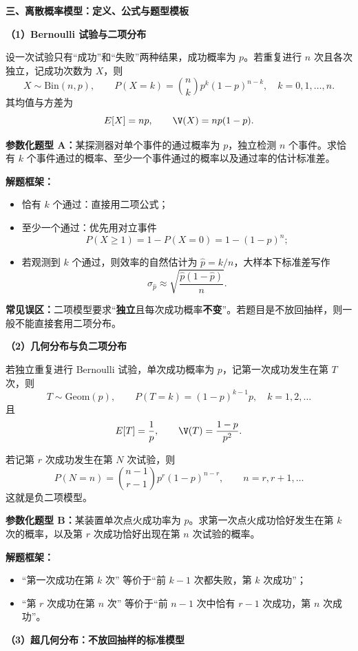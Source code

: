 \textbf{三、离散概率模型：定义、公式与题型模板}

\textbf{（1）Bernoulli 试验与二项分布}

设一次试验只有“成功”和“失败”两种结果，成功概率为 $p$。若重复进行 $n$ 次且各次独立，记成功次数为 $X$，则
\[
X\sim \mathrm{Bin}(n,p),\qquad P(X=k)=\binom{n}{k}p^k(1-p)^{n-k},\quad k=0,1,\dots,n.
\]
其均值与方差为
\[
E[X]=np,\qquad \V(X)=np(1-p).
\]

\textbf{参数化题型 A：}某探测器对单个事件的通过概率为 $p$，独立检测 $n$ 个事件。求恰有 $k$ 个事件通过的概率、至少一个事件通过的概率以及通过率的估计标准差。

\textbf{解题框架：}
\begin{itemize}[leftmargin=2em,itemsep=0.12em,topsep=0.12em]
  \item 恰有 $k$ 个通过：直接用二项公式；
  \item 至少一个通过：优先用对立事件
  \[
  P(X\ge 1)=1-P(X=0)=1-(1-p)^n;
  \]
  \item 若观测到 $k$ 个通过，则效率的自然估计为 $\hat p=k/n$，大样本下标准差写作
  \[
  \sigma_{\hat p}\approx \sqrt{\frac{\hat p(1-\hat p)}{n}}.
  \]
\end{itemize}

\textbf{常见误区：}二项模型要求“\textbf{独立}且每次成功概率\textbf{不变}”。若题目是不放回抽样，则一般不能直接套用二项分布。

\textbf{（2）几何分布与负二项分布}

若独立重复进行 Bernoulli 试验，单次成功概率为 $p$，记第一次成功发生在第 $T$ 次，则
\[
T\sim \mathrm{Geom}(p),\qquad P(T=k)=(1-p)^{k-1}p,\quad k=1,2,\dots
\]
且
\[
E[T]=\frac{1}{p},\qquad \V(T)=\frac{1-p}{p^2}.
\]

若记第 $r$ 次成功发生在第 $N$ 次试验，则
\[
P(N=n)=\binom{n-1}{r-1}p^r(1-p)^{n-r},\qquad n=r,r+1,\dots
\]
这就是负二项模型。

\textbf{参数化题型 B：}某装置单次点火成功率为 $p$。求第一次点火成功恰好发生在第 $k$ 次的概率，以及第 $r$ 次成功恰好出现在第 $n$ 次试验的概率。

\textbf{解题框架：}
\begin{itemize}[leftmargin=2em,itemsep=0.12em,topsep=0.12em]
  \item ``第一次成功在第 $k$ 次'' 等价于“前 $k-1$ 次都失败，第 $k$ 次成功”；
  \item ``第 $r$ 次成功在第 $n$ 次'' 等价于“前 $n-1$ 次中恰有 $r-1$ 次成功，第 $n$ 次成功”。
\end{itemize}

\textbf{（3）超几何分布：不放回抽样的标准模型}

